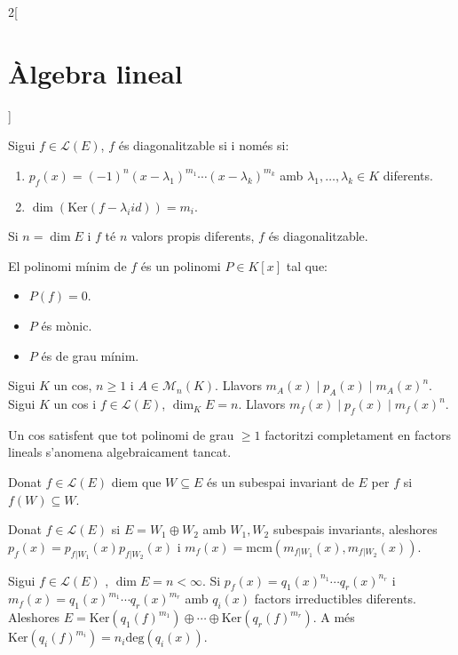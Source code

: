 \documentclass[class=article,10pt,crop=false]{standalone}
\begin{document}
\begin{multicols}{2}[\section{Àlgebra lineal}]
\begin{theorem}
Sigui $f\in\mathcal{L}(E)$, $f$ és diagonalitzable si i només si:
\begin{enumerate}
    \item $p_f(x)=(-1)^n(x-\lambda_1)^{m_1}\cdots(x-\lambda_k)^{m_k}$ amb $\lambda_1,\ldots,\lambda_k\in K$ diferents.
    \item $\dim(\text{Ker}(f-\lambda_i id))=m_i$.
\end{enumerate}
\end{theorem}
\begin{corollary}
Si $n=\dim E$ i $f$ té $n$ valors propis diferents, $f$ és diagonalitzable.
\end{corollary}
\begin{definition}
El polinomi mínim de $f$ és un polinomi $P\in K[x]$ tal que:
\begin{itemize}
    \item $P(f)=0$.
    \item $P$ és mònic.
    \item $P$ és de grau mínim.
\end{itemize}
\end{definition}
\begin{theorem}
Sigui $K$ un cos, $n\geq 1$ i $A\in\mathcal{M}_n(K)$. Llavors $m_A(x)\mid p_A(x)\mid m_A(x)^n$. Sigui $K$ un cos i $f\in\mathcal{L}(E)$, $\dim_K E=n$. Llavors $m_f(x)\mid p_f(x)\mid m_f(x)^n$. 
\end{theorem}
\begin{definition}
Un cos satisfent que tot polinomi de grau $\geq 1$ factoritzi completament en factors lineals s'anomena algebraicament tancat.
\end{definition}
\begin{definition}
Donat $f\in\mathcal{L}(E)$ diem que $W\subseteq E$ és un subespai invariant de $E$ per $f$ si $f(W)\subseteq W$.
\end{definition}
\begin{lemma}
Donat $f\in\mathcal{L}(E)$ si $E=W_1\oplus W_2$ amb $W_1,W_2$ subespais invariants, aleshores $p_f(x)=p_{f|W_1}(x)p_{f|W_2}(x)$ i $m_f(x)=\text{mcm}(m_{f|W_1}(x),m_{f|W_2}(x))$.
\end{lemma}
\begin{theorem}
Sigui $f\in\mathcal{L}(E)$ , $\dim E=n<\infty$. Si $p_f(x)=q_1(x)^{n_1}\cdots q_r(x)^{n_r}$ i $m_f(x)=q_1(x)^{m_1}\cdots q_r(x)^{m_r}$ amb $q_i(x)$ factors irreductibles diferents. Aleshores $E=\text{Ker}(q_1(f)^{m_1})\oplus\cdots\oplus\text{Ker}(q_r(f)^{m_r})$. A més $\text{Ker}(q_i(f)^{m_i})=n_i\text{deg}(q_i(x))$.

\end{theorem}
\end{multicols}
\end{document}

